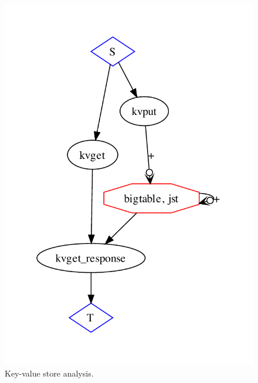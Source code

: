 \begin{figure}[t]
\centering
\includegraphics[width=0.5\linewidth]{fig/basickvs.pdf}
\vspace{-10pt}
\caption{Key-value store analysis.}
\label{fig:pdg-kvs-analysis}
\vspace{-2pt}
\end{figure}